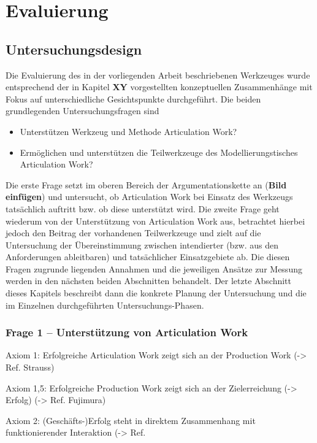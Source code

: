 \part{Evaluierung} %
\label{prt:evaluierung}

\chapter{Untersuchungsdesign} %
\label{cha:untersuchungsdesign}

Die Evaluierung des in der vorliegenden Arbeit beschriebenen Werkzeuges wurde entsprechend der in Kapitel \textbf{XY} vorgestellten konzeptuellen Zusammenhänge mit Fokus auf unterschiedliche Gesichtspunkte durchgeführt. Die beiden grundlegenden Untersuchungsfragen sind
\begin{itemize}
	\item Unterstützen Werkzeug und Methode Articulation Work?
	\item Ermöglichen und unterstützen die Teilwerkzeuge des Modellierungstisches Articulation Work?
\end{itemize}
Die erste Frage setzt im oberen Bereich der Argumentationskette an (\textbf{Bild einfügen}) und untersucht, ob Articulation Work bei Einsatz des Werkzeugs tatsächlich auftritt bzw. ob diese unterstützt wird. Die zweite Frage geht wiederum von der Unterstützung von Articulation Work aus, betrachtet hierbei jedoch den Beitrag der vorhandenen Teilwerkzeuge und zielt auf die Untersuchung der Übereinstimmung zwischen intendierter (bzw. aus den Anforderungen ableitbaren) und tatsächlicher Einsatzgebiete ab. Die diesen Fragen zugrunde liegenden Annahmen und die jeweiligen Ansätze zur Messung werden in den nächsten beiden Abschnitten behandelt. Der letzte Abschnitt dieses Kapitels beschreibt dann die konkrete Planung der Untersuchung und die im Einzelnen durchgeführten Untersuchungs-Phasen. 

\section{Frage 1 – Unterstützung von Articulation Work} %
\label{sec:frage_1_unterstützung_von_articulation_work}

Axiom 1:
Erfolgreiche Articulation Work zeigt sich an der Production Work (-> Ref. Strauss)

Axiom 1,5:
Erfolgreiche Production Work zeigt sich an der Zielerreichung (-> Erfolg) (-> Ref. Fujimura)

Axiom 2: 
(Geschäfts-)Erfolg steht in direktem Zusammenhang mit funktionierender Interaktion (-> Ref. 

